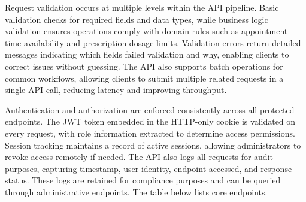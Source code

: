 \justifying
\noindent Request validation occurs at multiple levels within the API pipeline. Basic validation checks for required fields and data types, while business logic validation ensures operations comply with domain rules such as appointment time availability and prescription dosage limits. Validation errors return detailed messages indicating which fields failed validation and why, enabling clients to correct issues without guessing. The API also supports batch operations for common workflows, allowing clients to submit multiple related requests in a single API call, reducing latency and improving throughput.

\justifying
\noindent Authentication and authorization are enforced consistently across all protected endpoints. The JWT token embedded in the HTTP-only cookie is validated on every request, with role information extracted to determine access permissions. Session tracking maintains a record of active sessions, allowing administrators to revoke access remotely if needed. The API also logs all requests for audit purposes, capturing timestamp, user identity, endpoint accessed, and response status. These logs are retained for compliance purposes and can be queried through administrative endpoints. The table below lists core endpoints.

